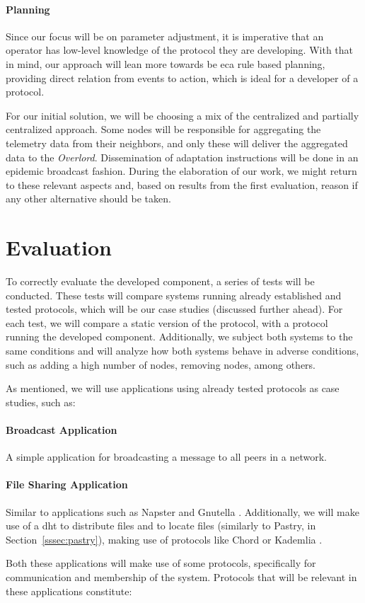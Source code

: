 \paragraph{Planning} Since our focus will be on parameter adjustment, it is imperative that an operator has low-level knowledge of the protocol they are developing. With that in mind, our approach will lean more towards be \gls{eca} rule based planning, providing direct relation from events to action, which is ideal for a developer of a protocol.%
\par For our initial solution, we will be choosing a mix of the centralized and partially centralized approach. Some nodes will be responsible for aggregating the telemetry data from their neighbors, and only these will deliver the aggregated data to the \textit{Overlord}. Dissemination of adaptation instructions will be done in an epidemic broadcast fashion. During the elaboration of our work, we might return to these relevant aspects and, based on results from the first evaluation, reason if any other alternative should be taken. %
%
%
%
\section{Evaluation}
\label{sec:evaluation}
\par To correctly evaluate the developed component, a series of tests will be conducted. These tests will compare systems running already established and tested protocols, which will be our case studies (discussed further ahead). For each test, we will compare a static version of the protocol, with a protocol running the developed component. Additionally, we subject both systems to the same conditions and will analyze how both systems behave in adverse conditions, such as adding a high number of nodes, removing nodes, among others.
\par As mentioned, we will use applications using already tested protocols as case studies, such as:
\paragraph{Broadcast Application} A simple application for broadcasting a message to all peers in a network.
\paragraph{File Sharing Application} Similar to applications such as Napster \cite{Napster} and Gnutella \cite{Bordignon2001}. Additionally, we will make use of a \gls{dht} to distribute files and to locate files (similarly to Pastry, in Section~\ref{sssec:pastry}), making use of protocols like Chord \cite{Chord2003} or Kademlia \cite{Kademlia2002}.
\par Both these applications will make use of some protocols, specifically for communication and membership of the system. Protocols that will be relevant in these applications constitute:
